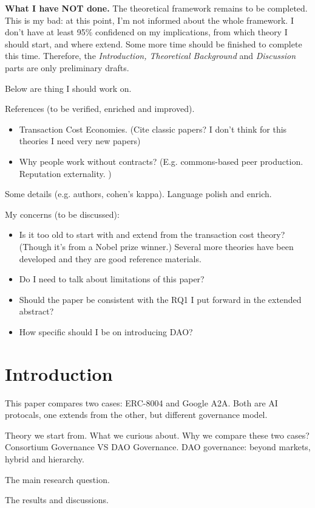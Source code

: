 \documentclass[conference]{IEEEtran}
\begin{document}
\textbf{What I have NOT done.} The theoretical framework remains to be completed. This is my bad: at this point, I'm not informed about the whole framework. I don't have at least 95\% confidencd on my implications, from which theory I should start, and where extend. Some more time should be finished to complete this time. Therefore, the \textit{Introduction, Theoretical Background} and \textit{Discussion} parts are only preliminary drafts.

Below are thing I should work on. 

References (to be verified, enriched and improved).
\begin{itemize}
    \item Transaction Cost Economies. (Cite classic papers? I don't think for this theories I need very new papers)
    \item Why people work without contracts? (E.g. commons-based peer production. Reputation externality. )
\end{itemize}

Some details (e.g. authors, cohen's kappa). Language polish and enrich.

My concerns (to be discussed):
\begin{itemize}
    \item Is it too old to start with and extend from the transaction cost theory? (Though it's from a Nobel prize winner.) Several more theories have been developed and they are good reference materials. 
    \item Do I need to talk about limitations of this paper?
    \item Should the paper be consistent with the RQ1 I put forward in the extended abstract?
    \item How specific should I be on introducing DAO?
\end{itemize}

\section{Introduction}
This paper compares two cases: ERC-8004 and Google A2A. Both are AI protocals, one extends from the other, but different governance model. 

Theory we start from. What we curious about. Why we compare these two cases? Consortium Governance VS DAO Governance. DAO governance: beyond markets, hybrid and hierarchy. 

The main research question.

The results and discussions.
\end{document}
